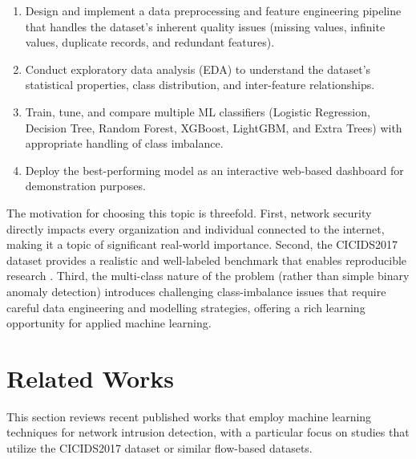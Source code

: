 \documentclass[12pt, a4paper]{article}
\begin{document}
\begin{enumerate}[label=(\roman*)]
    \item Design and implement a data preprocessing and feature engineering pipeline that handles the dataset's inherent quality issues (missing values, infinite values, duplicate records, and redundant features).
    \item Conduct exploratory data analysis (EDA) to understand the dataset's statistical properties, class distribution, and inter-feature relationships.
    \item Train, tune, and compare multiple ML classifiers (Logistic Regression, Decision Tree, Random Forest, XGBoost, LightGBM, and Extra Trees) with appropriate handling of class imbalance.
    \item Deploy the best-performing model as an interactive web-based dashboard for demonstration purposes.
\end{enumerate}

The motivation for choosing this topic is threefold.
First, network security directly impacts every organization and individual connected to the internet, making it a topic of significant real-world importance.
Second, the CICIDS2017 dataset provides a realistic and well-labeled benchmark that enables reproducible research \cite{cicids2017}.
Third, the multi-class nature of the problem (rather than simple binary anomaly detection) introduces challenging class-imbalance issues that require careful data engineering and modelling strategies, offering a rich learning opportunity for applied machine learning.


\newpage
\section{Related Works}

This section reviews recent published works that employ machine learning techniques for network intrusion detection, with a particular focus on studies that utilize the CICIDS2017 dataset or similar flow-based datasets.
\end{document}
